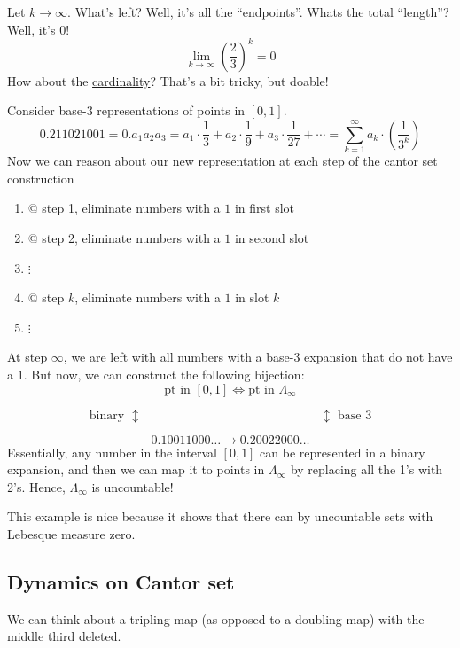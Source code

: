 \documentclass{article}
\begin{document}
Let $k\to \infty$. What's left? Well, it's all the ``endpoints''. Whats the total ``length''? Well, it's $0$!
\[
\lim_{k\to \infty} \left(\frac{2}{3}\right)^k=0
\]
How about the \underline{cardinality}? That's a bit tricky, but doable!

Consider base-3 representations of points in $[0,1]$.
\[
0.211021001 = 0.a_1a_2a_3=a_1\cdot\frac{1}{3} + a_2\cdot\frac{1}{9} + a_3\cdot\frac{1}{27} + \cdots = \sum_{k=1}^{\infty}a_k\cdot\left(\frac{1}{3^k}\right)
\]
Now we can reason about our new representation at each step of the cantor set construction 
\begin{enumerate}
    \item @ step 1, eliminate numbers with a $1$ in first slot
    \item @ step 2, eliminate numbers with a $1$ in second slot 
    \item $\vdots$
    \item @ step $k$, eliminate numbers with a $1$ in slot $k$
    \item $\vdots$
\end{enumerate}
At step $\infty$, we are left with all numbers with a base-3 expansion that do not have a $1$. But now, we can construct the following bijection:
\[
\text{pt in } [0, 1] \iff \text{pt in } \Lambda_\infty
\]

\[
\text{binary } \updownarrow \hspace{6cm} \updownarrow \text{ base 3}
\]

\[
0.10011000\ldots \longrightarrow 0.20022000\ldots
\]
Essentially, any number in the interval $[0,1]$ can be represented in a binary expansion, and then we can map it to points in $\Lambda_\infty$ by replacing all the 1's with 2's. Hence, $\Lambda_\infty$ is uncountable!

This example is nice because it shows that there can by uncountable sets with Lebesque measure zero.

\subsection{Dynamics on Cantor set}

We can think about a tripling map (as opposed to a doubling map) with the middle third deleted.

\vspace{1em}
\end{document}
